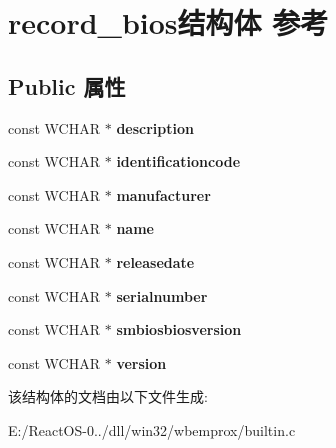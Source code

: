 \hypertarget{structrecord__bios}{}\section{record\+\_\+bios结构体 参考}
\label{structrecord__bios}
\subsection*{Public 属性}
\begin{DoxyCompactItemize}
\item 
\mbox{\label{structrecord__bios_acf03e31d0cefba5438141dc15d2b1adb}} 
const W\+C\+H\+AR $\ast$ {\bfseries description}
\item 
\mbox{\label{structrecord__bios_a807b516bca8092122e6a3ca1b3f62e0e}} 
const W\+C\+H\+AR $\ast$ {\bfseries identificationcode}
\item 
\mbox{\label{structrecord__bios_afcd90795644ff7b9f881b8fa0c76c201}} 
const W\+C\+H\+AR $\ast$ {\bfseries manufacturer}
\item 
\mbox{\label{structrecord__bios_a3bc22906c4650b7c7f166443c7967a27}} 
const W\+C\+H\+AR $\ast$ {\bfseries name}
\item 
\mbox{\label{structrecord__bios_a4c520701bdd40bfe359f8263bec0894f}} 
const W\+C\+H\+AR $\ast$ {\bfseries releasedate}
\item 
\mbox{\label{structrecord__bios_a36bb5c69b747c9e8b37fb88171f5fd5b}} 
const W\+C\+H\+AR $\ast$ {\bfseries serialnumber}
\item 
\mbox{\label{structrecord__bios_a9706f23b8383c4aee83e80ce43ca3b08}} 
const W\+C\+H\+AR $\ast$ {\bfseries smbiosbiosversion}
\item 
\mbox{\label{structrecord__bios_a79398939a3234c1ad6594e07ba68ac85}} 
const W\+C\+H\+AR $\ast$ {\bfseries version}
\end{DoxyCompactItemize}


该结构体的文档由以下文件生成\+:\begin{DoxyCompactItemize}
\item 
E\+:/\+React\+O\+S-\/0../dll/win32/wbemprox/builtin.\+c\end{DoxyCompactItemize}
